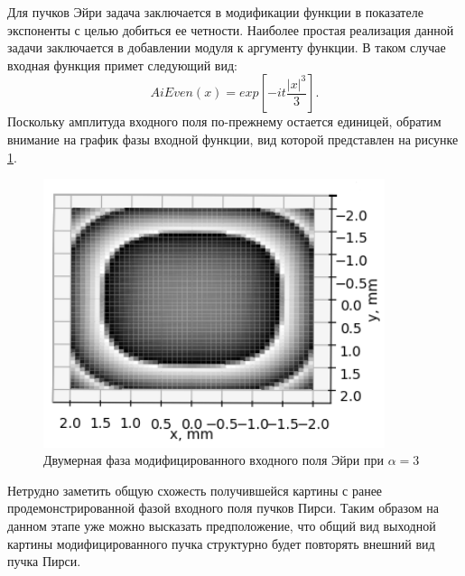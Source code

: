 {{	Для пучков Эйри задача заключается в модификации функции в показателе экспоненты с целью добиться ее четности. Наиболее простая реализация данной задачи заключается в добавлении модуля к аргументу функции. В таком случае входная функция примет следующий вид:
	\begin{equation*}
	AiEven(x) = exp[-it \frac{|x|^3}{3}].
	\end{equation*}
	Поскольку амплитуда входного поля по-прежнему остается единицей, обратим внимание на график фазы входной функции, вид которой представлен на рисунке \ref{aieven_phase_2d}.
	\begin{figure}[H]
		  \begin{center}
			\includegraphics[width=10cm]{plots/aievenphase_new}
	\caption{Двумерная фаза модифицированного входного поля Эйри при $\alpha  = 3$}
	\label{aieven_phase_2d}
		 \end{center}
\end{figure}

	Нетрудно заметить общую схожесть получившейся картины с ранее продемонстрированной фазой входного поля пучков Пирси. Таким образом на данном этапе уже можно высказать предположение, что общий вид выходной картины модифицированного пучка структурно будет повторять внешний вид пучка Пирси.
	
}}
